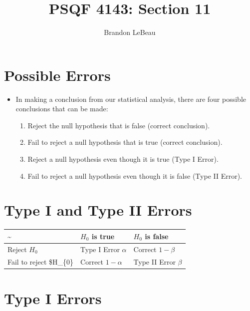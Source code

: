 \documentclass[12pt]{article}
\title{PSQF 4143: Section 11}
\author{Brandon LeBeau}
\date{}
\begin{document}
\maketitle

\section{Possible Errors}\label{possible-errors}

\begin{itemize}
\itemsep1pt\parskip0pt
\item
  In making a conclusion from our statistical analysis, there are four
  possible conclusions that can be made:

  \begin{enumerate}
  \def\labelenumi{\arabic{enumi}.}
  \itemsep1pt\parskip0pt
  \item
    Reject the null hypothesis that is false (correct conclusion).
  \item
    Fail to reject a null hypothesis that is true (correct conclusion).
  \item
    Reject a null hypothesis even though it is true (Type I Error).
  \item
    Fail to reject a null hypothesis even though it is false (Type II
    Error).
  \end{enumerate}
\end{itemize}

\section{Type I and Type II Errors}\label{type-i-and-type-ii-errors}

\begin{longtable}[c]{@{}lll@{}}
\toprule
\textasciitilde{} & \(H_{0}\) is true & \(H_{0}\) is
false\tabularnewline
\midrule
\endhead
Reject \(H_{0}\) & Type I Error \(\alpha\) & Correct
\(1 - \beta\)\tabularnewline
Fail to reject \$H\_\{0\} & Correct \(1-\alpha\) & Type II Error
\(\beta\)\tabularnewline
\bottomrule
\end{longtable}

\section{Type I Errors}\label{type-i-errors}
\end{document}
